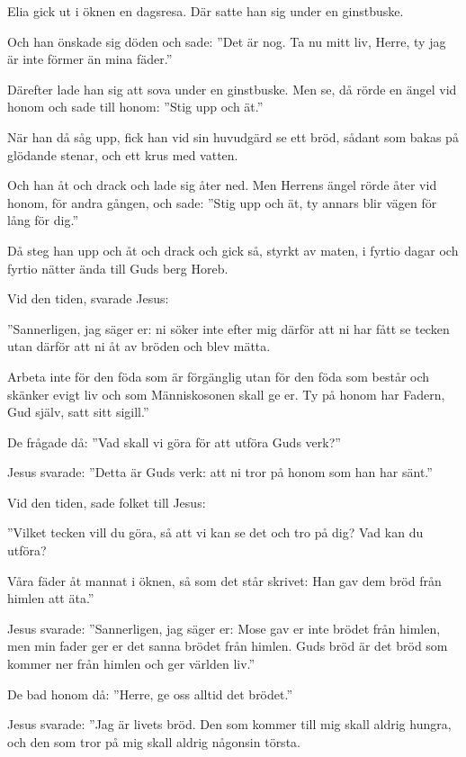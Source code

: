 {Elia gick ut i öknen en dagsresa. Där satte han sig under en ginstbuske. }

Och han önskade sig döden och sade: ''Det är nog. Ta nu mitt liv, Herre, ty jag är inte förmer än mina fäder.'' 

Därefter lade han sig att sova under en ginstbuske. Men se, då rörde en ängel vid honom och sade till honom: ''Stig upp och ät.'' 

När han då såg upp, fick han vid sin huvudgärd se ett bröd, sådant som bakas på glödande stenar, och ett krus med vatten. 

Och han åt och drack och lade sig åter ned. Men Herrens ängel rörde åter vid honom, för andra gången, och sade: ''Stig upp och ät, ty annars blir vägen för lång för dig.'' 

Då steg han upp och åt och drack och gick så, styrkt av maten, i fyrtio dagar och fyrtio nätter ända till Guds berg Horeb.

{Vid den tiden, svarade Jesus:}

 ''Sannerligen, jag säger er: ni söker inte efter mig därför att ni har fått se tecken utan därför att ni åt av bröden och blev mätta. 
 
 Arbeta inte för den föda som är förgänglig utan för den föda som består och skänker evigt liv och som Människosonen skall ge er. Ty på honom har Fadern, Gud själv, satt sitt sigill.''  
 
 De frågade då: ''Vad skall vi göra för att utföra Guds verk?'' 
 
 Jesus svarade: ''Detta är Guds verk: att ni tror på honom som han har sänt.''


{Vid den tiden, sade folket till Jesus: }

''Vilket tecken vill du göra, så att vi kan se det och tro på dig? Vad kan du utföra? 

Våra fäder åt mannat i öknen, så som det står skrivet: Han gav dem bröd från himlen att äta.'' 

Jesus svarade: ''Sannerligen, jag säger er: Mose gav er inte brödet från himlen, men min fader ger er det sanna brödet från himlen.  Guds bröd är det bröd som kommer ner från himlen och ger världen liv.'' 

De bad honom då: ''Herre, ge oss alltid det brödet.'' 

Jesus svarade: ''Jag är livets bröd. Den som kommer till mig skall aldrig hungra, och den som tror på mig skall aldrig någonsin törsta. 


